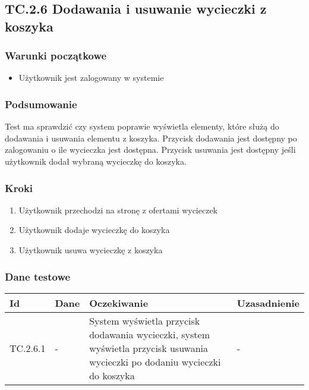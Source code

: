 \documentclass[a4paper,15pt]{article}
\begin{document}
\newpage
\begin{framed}
\subsection{TC.2.6 Dodawania i usuwanie wycieczki z koszyka}


\vspace{0.5cm}

\subsubsection{Warunki początkowe}
\begin{itemize}
\item Użytkownik jest zalogowany w systemie
\end{itemize}

\subsubsection{Podsumowanie}
Test ma sprawdzić czy system poprawie wyświetla elementy, które służą do dodawania i usuwania elementu z koszyka. Przycisk dodawania jest dostępny po zalogowaniu o ile wycieczka jest dostępna. Przycisk usuwania jest dostępny jeśli użytkownik dodał wybraną wycieczkę do koszyka. 

\subsubsection{Kroki}
\begin{enumerate}
\item Użytkownik przechodzi na stronę z ofertami wycieczek
\item Użytkownik dodaje wycieczkę do koszyka
\item Użytkownik usuwa wycieczkę z koszyka
\end{enumerate}

\subsubsection{Dane testowe}

\begin{center}
\begin{tabular}{ |C{1.5cm}|C{3cm}|C{4cm}|C{4cm}| } 
 \hline
 \textbf{Id} & \textbf{Dane} & \textbf{Oczekiwanie} & \textbf{Uzasadnienie} \\ \hline
 TC.2.6.1 & - & System wyświetla przycisk dodawania wycieczki, system wyświetla przycisk usuwania wycieczki po dodaniu wycieczki do koszyka & - \\ \hline
\end{tabular}
\end{center}

\end{framed}
\end{document}

